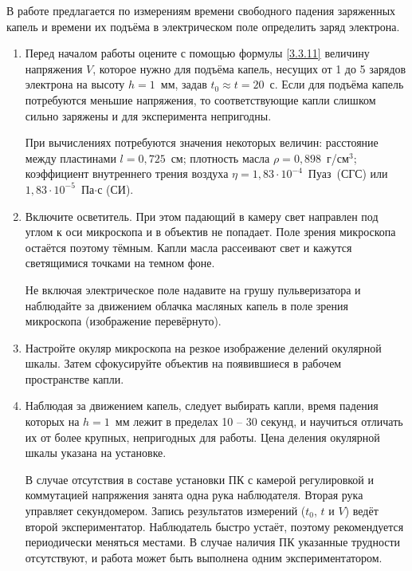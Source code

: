 \begin{lab:task}

В работе предлагается по измерениям времени свободного падения заряженных капель и времени их подъёма в электрическом поле определить заряд электрона.

\begin{enumerate}

\item{Перед началом работы оцените с помощью формулы \eqref{3.3.11} величину напряжения $V$, которое нужно для подъёма капель, несущих от 1 до 5 зарядов электрона на высоту $h=1$~мм, задав $t_0\approx t=20$~с. Если для подъёма капель потребуются меньшие напряжения, то соответствующие капли слишком сильно заряжены и для эксперимента непригодны.

При вычислениях потребуются значения некоторых величин: расстояние между пластинами $l=0,725$~см; плотность масла
$\rho=0,898$~г/см$^3$; коэффициент внутреннего трения воздуха $\eta=1,83\cdot 10^{-4}$~Пуаз~(СГС) или $1,83\cdot 10^{-5}$~Па$\cdot$с (СИ).}

\item{Включите осветитель. При этом падающий в камеру свет направлен под углом к оси микроскопа и в объектив не попадает. Поле зрения микроскопа остаётся поэтому тёмным. Капли масла рассеивают свет и кажутся светящимися точками на темном фоне.

Не включая электрическое поле  надавите на грушу пульверизатора  и наблюдайте за движением облачка масляных капель в поле зрения микроскопа (изображение перевёрнуто).}

\item{Настройте окуляр микроскопа на резкое изображение делений окулярной шкалы. Затем сфокусируйте объектив на появившиеся в рабочем пространстве капли.}

\item{Наблюдая за движением капель, следует выбирать капли, время падения которых на $h=1$~мм лежит в пределах
10 -- 30 секунд, и научиться отличать их от более крупных, непригодных для работы. Цена деления окулярной шкалы указана на установке.

В случае отсутствия в составе установки ПК с камерой регулировкой и коммутацией напряжения занята одна рука наблюдателя. Вторая рука управляет секундомером. Запись результатов измерений ($t_0$, $t$ и $V$) ведёт второй экспериментатор. Наблюдатель быстро устаёт, поэтому рекомендуется периодически меняться местами. В случае наличия ПК указанные трудности отсутствуют, и работа может быть выполнена одним экспериментатором.

}
\end{enumerate}
\end{lab:task}
